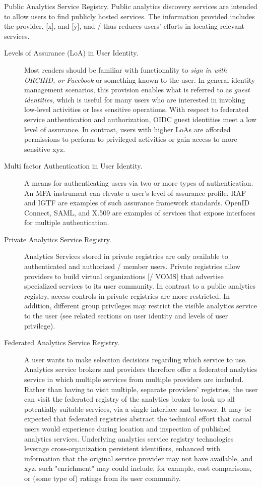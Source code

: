 Public Analytics Service Registry. Public analytics discovery
services are intended to allow users to find publicly hosted
services. The information provided includes the provider, [x], and
[y], and / thus reduces users' efforts in locating relevant services.

\begin{description}

\item[Levels of Assurance (LoA) in User Identity.] Most readers should
  be familiar with functionality to {\em sign in with ORCHID, or
    Facebook} or something known to the user. In general identity
  management scenarios, this provision enables what is referred to as
  {\em guest identities}, which is useful for many users who are
  interested in invoking low-level activities or less sensitive
  operations. With respect to federated service authentication and
  authorization, OIDC guest identities meet a low level of
  assurance. In contrast, users with higher LoAs are afforded
  permissions to perform to privileged activities or gain access to
  more sensitive xyz.

\item[Multi factor Authentication in User Identity.] A means for
  authenticating users via two or more types of
  authentication. An MFA instrument can elevate a user's level of
  assurance profile. RAF and IGTF are examples of such assurance
  framework standards.  OpenID Connect, SAML, and X.509 are examples
  of services that expose interfaces for multiple authentication.

\item[Private Analytics Service Registry.] Analytics Services stored
  in private registries are only available to authenticated and
  authorized / member users. Private registries allow providers to
  build virtual organizations [/ VOMS] that advertise specialized
  services to its user community. In contrast to a public analytics
  registry, access controls in private registries are more
  restricted. In addition, different group privileges may restrict the
  visible analytics service to the user (see related sections on
  user identity and levels of user privilege).

\item[Federated Analytics Service Registry.] A user wants to make
  selection decisions regarding which service to use. Analytics
  service brokers and providers therefore offer a federated analytics
  service in which multiple services from multiple providers are
  included. Rather than having to visit multiple, separate providers'
  registries, the user can visit the federated registry of the
  analytics broker to look up all potentially suitable services, via a
  single interface and browser. It may be expected that federated
  registries abstract the technical effort that casual users would
  experience during location and inspection of published analytics
  services.  Underlying analytics service registry technologies
  leverage cross-organization persistent identifiers, enhanced with
  information that the original service provider may not have
  available, and xyz. such "enrichment" may could include, for example,
  cost comparisons, or (some type of) ratings from its user community.


\end{description}
